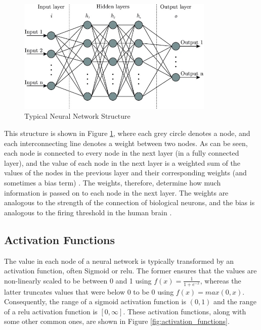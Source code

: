 \begin{figure}[h]
    \centering
    \includegraphics[height=5.5cm] {paper/images/neural_network_structure.jpeg} %
    \caption{Typical Neural Network Structure \citep{Shukla}}
    \label{fig:neural_network_structure}
\end{figure}

This structure is shown in Figure \ref{fig:neural_network_structure}, where each grey circle denotes a node, and each interconnecting line denotes a weight between two nodes. As can be seen, each node is connected to every node in the next layer (in a fully connected layer), and the value of each node in the next layer is a weighted sum of the values of the nodes in the previous layer and their corresponding weights (and sometimes a bias term) \citep{Bishop}. The weights, therefore, determine how much information is passed on to each node in the next layer. The weights are analogous to the strength of the connection of biological neurons, and the bias is analogous to the firing threshold in the human brain \citep{rathi2020dietsnn}.

\subsection{Activation Functions}\label{sec:background_anns_activation_functions}
The value in each node of a neural network is typically transformed by an activation function, often Sigmoid or \acrfull{relu}. The former ensures that the values are non-linearly scaled to be between 0 and 1 using $f(x) = \frac{1}{1+e^{-x}}$, whereas the latter truncates values that were below 0 to be 0 using $f(x) = max(0, x)$. Consequently, the range of a sigmoid activation function is $(0, 1)$ and the range of a \acrshort{relu} activation function is $[0, \infty]$. These activation functions, along with some other common ones, are shown in Figure \ref{fig:activation_functions}.

